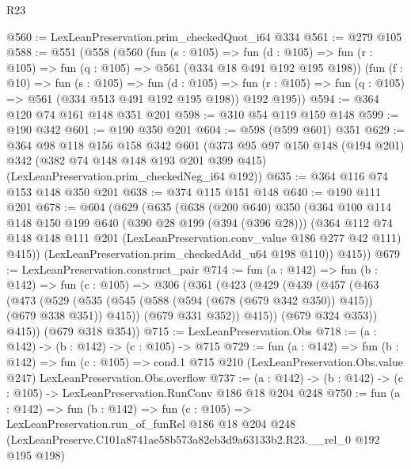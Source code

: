 \begin{lexlean}{R23}
\begin{coremodule}
@560 := LexLeanPreservation.prim_checkedQuot_i64 @334
@561 := @279 @105
@588 := @551
    (@558
      (@560
        (fun (s : @105) =>
        fun (d : @105) => fun (r : @105) => fun (q : @105) => @561 (@334 @18 @491 @192 @195 @198))
        (fun (f : @10) =>
        fun (s : @105) =>
        fun (d : @105) => fun (r : @105) => fun (q : @105) => @561 (@334 @513 @491 @192 @195 @198))
        @192
        @195))
@594 := @364 @120 @74 @161 @148 @351 @201
@598 := @310 @54 @119 @159 @148
@599 := @190 @342
@601 := @190 @350 @201
@604 := @598 (@599 @601) @351
@629 := @364
    @98
    @118
    @156
    @158
    @342
    @601
    (@373
      @95
      @97
      @150
      @148
      (@194 @201)
      @342
      (@382 @74 @148 @148 @193 @201 @399 @415)
      (LexLeanPreservation.prim_checkedNeg_i64 @192))
@635 := @364 @116 @74 @153 @148 @350 @201
@638 := @374 @115 @151 @148
@640 := @190 @111 @201
@678 := @604
    (@629
      (@635
        (@638
          (@200 @640)
          @350
          (@364
            @100
            @114
            @148
            @150
            @199
            @640
            (@390 @28 @199 (@394 (@396 @28)))
            (@364
              @112
              @74
              @148
              @148
              @111
              @201
              (LexLeanPreservation.conv_value @186 @277 @42 @111)
              @415))
          (LexLeanPreservation.prim_checkedAdd_u64 @198 @110))
        @415))
@679 := LexLeanPreservation.construct_pair
@714 := fun (a : @142) =>
  fun (b : @142) =>
  fun (c : @105) =>
  @306
    (@361
      (@423
        (@429
          (@439
            (@457
              (@463
                (@473
                  (@529
                    (@535 (@545 (@588 (@594 (@678 (@679 @342 @350)) @415)) (@679 @338 @351)) @415))
                  (@679 @331 @352))
                @415))
            (@679 @324 @353))
          @415))
      (@679 @318 @354))
@715 := LexLeanPreservation.Obs
@718 := (a : @142) -> (b : @142) -> (c : @105) -> @715
@729 := fun (a : @142) =>
  fun (b : @142) =>
  fun (c : @105) =>
  cond.{1} @715 @210 (LexLeanPreservation.Obs.value @247) LexLeanPreservation.Obs.overflow
@737 := (a : @142) -> (b : @142) -> (c : @105) -> LexLeanPreservation.RunConv @186 @18 @204 @248
@750 := fun (a : @142) =>
  fun (b : @142) =>
  fun (c : @105) =>
  LexLeanPreservation.run_of_funRel
    @186
    @18
    @204
    @248
    (LexLeanPreserve.C101a8741ae58b573a82eb3d9a63133b2.R23.__rel_0 @192 @195 @198)
\end{coremodule}
\end{lexlean}

